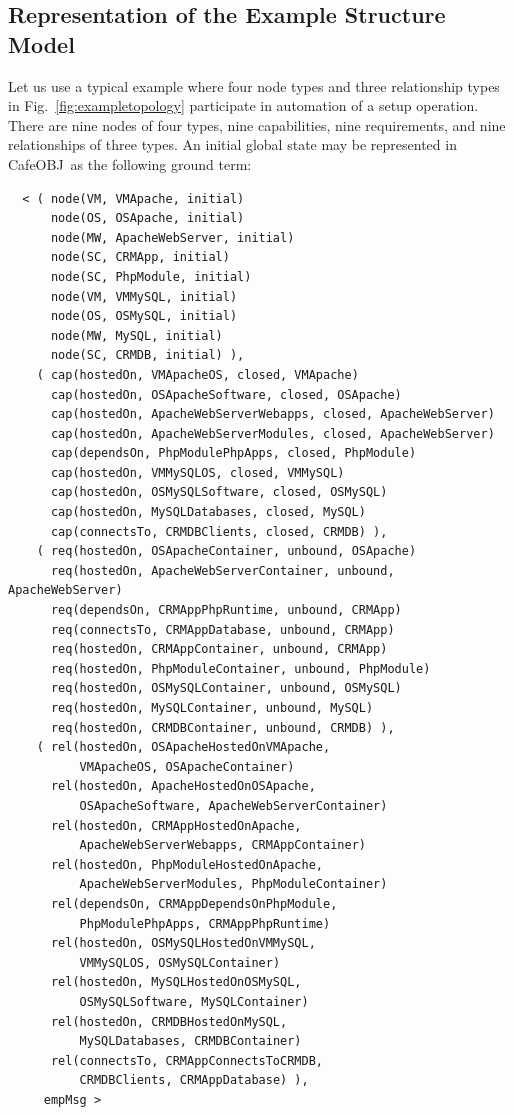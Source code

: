 \documentclass[12pt]{report}
\newcommand{\cafeobj}{{\sf CafeOBJ}~}
\begin{document}
\subsection{Representation of the Example Structure Model}
\label{sec:TOSCAstructRep}
Let us use a typical example where four node types and three
relationship types in Fig.~\ref{fig:exampletopology} participate in
automation of a setup operation.  There are nine nodes of four types,
nine capabilities, nine requirements, and nine relationships of three
types. An initial global state may be represented in \cafeobj as the
following ground term:
\small
\begin{verbatim}
  < ( node(VM, VMApache, initial)
      node(OS, OSApache, initial)
      node(MW, ApacheWebServer, initial)
      node(SC, CRMApp, initial)
      node(SC, PhpModule, initial)
      node(VM, VMMySQL, initial)
      node(OS, OSMySQL, initial)
      node(MW, MySQL, initial)
      node(SC, CRMDB, initial) ),
    ( cap(hostedOn, VMApacheOS, closed, VMApache)
      cap(hostedOn, OSApacheSoftware, closed, OSApache)
      cap(hostedOn, ApacheWebServerWebapps, closed, ApacheWebServer)
      cap(hostedOn, ApacheWebServerModules, closed, ApacheWebServer)
      cap(dependsOn, PhpModulePhpApps, closed, PhpModule)
      cap(hostedOn, VMMySQLOS, closed, VMMySQL)
      cap(hostedOn, OSMySQLSoftware, closed, OSMySQL)
      cap(hostedOn, MySQLDatabases, closed, MySQL)
      cap(connectsTo, CRMDBClients, closed, CRMDB) ),
    ( req(hostedOn, OSApacheContainer, unbound, OSApache)
      req(hostedOn, ApacheWebServerContainer, unbound, ApacheWebServer)
      req(dependsOn, CRMAppPhpRuntime, unbound, CRMApp)
      req(connectsTo, CRMAppDatabase, unbound, CRMApp)
      req(hostedOn, CRMAppContainer, unbound, CRMApp)
      req(hostedOn, PhpModuleContainer, unbound, PhpModule)
      req(hostedOn, OSMySQLContainer, unbound, OSMySQL)
      req(hostedOn, MySQLContainer, unbound, MySQL)
      req(hostedOn, CRMDBContainer, unbound, CRMDB) ),
    ( rel(hostedOn, OSApacheHostedOnVMApache,
          VMApacheOS, OSApacheContainer)
      rel(hostedOn, ApacheHostedOnOSApache,
          OSApacheSoftware, ApacheWebServerContainer)
      rel(hostedOn, CRMAppHostedOnApache,
          ApacheWebServerWebapps, CRMAppContainer)
      rel(hostedOn, PhpModuleHostedOnApache,
          ApacheWebServerModules, PhpModuleContainer)
      rel(dependsOn, CRMAppDependsOnPhpModule,
          PhpModulePhpApps, CRMAppPhpRuntime)
      rel(hostedOn, OSMySQLHostedOnVMMySQL,
          VMMySQLOS, OSMySQLContainer)
      rel(hostedOn, MySQLHostedOnOSMySQL,
          OSMySQLSoftware, MySQLContainer)
      rel(hostedOn, CRMDBHostedOnMySQL,
          MySQLDatabases, CRMDBContainer)
      rel(connectsTo, CRMAppConnectsToCRMDB,
          CRMDBClients, CRMAppDatabase) ),
     empMsg > 
\end{verbatim}
\end{document}
